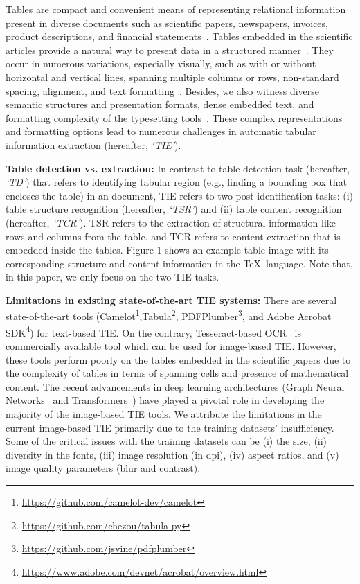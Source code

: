 \documentclass[runningheads]{llncs}
\begin{document}
Tables are compact and convenient means of representing relational information present in diverse documents such as scientific papers, newspapers, invoices, product descriptions, and financial statements~\cite{tkasar}. Tables embedded in the scientific articles provide a natural way to present data in a structured manner~\cite{douglas1995using}. They occur in numerous variations, especially visually, such as with or without horizontal and vertical lines, spanning multiple columns or rows, non-standard spacing, alignment, and text formatting~\cite{embley}. Besides, we also witness diverse semantic structures and presentation formats, dense embedded text, and formatting complexity of the typesetting tools~\cite{singh2019automated}. These complex representations and formatting options lead to numerous challenges in automatic tabular information extraction (hereafter, \textit{`TIE'}). 

\noindent \textbf{Table detection vs. extraction:}
In contrast to table detection task (hereafter, \textit{`TD'}) that refers to identifying tabular region (e.g., finding a bounding box that encloses the table) in an document, TIE refers to two post identification tasks: (i) table structure recognition (hereafter, \textit{`TSR'}) and (ii) table content recognition (hereafter, \textit{`TCR'}). TSR refers to the extraction of structural information like rows and columns from the table, and TCR refers to content extraction that is embedded inside the tables. Figure 1 shows an example table image with its corresponding structure and content information in the \TeX~language. Note that, in this paper, we only focus on the two TIE tasks. 


\noindent \textbf{Limitations in existing state-of-the-art TIE systems:} There are several state-of-the-art tools (Camelot\footnote{\url{https://github.com/camelot-dev/camelot}},Tabula\footnote{\url{https://github.com/chezou/tabula-py}}, PDFPlumber\footnote{\url{https://github.com/jsvine/pdfplumber}}, and Adobe Acrobat SDK\footnote{\url{https://www.adobe.com/devnet/acrobat/overview.html}}) for text-based TIE. On the contrary, Tesseract-based OCR~\cite{tesseract} is commercially available tool which can be used for image-based TIE. However, these tools perform poorly on the tables embedded in the scientific papers due to the complexity of tables in terms of spanning cells and presence of mathematical content.
The recent advancements in deep learning architectures (Graph Neural Networks~\cite{gnn} and Transformers~\cite{vaswani2017attention}) have played a pivotal role in developing the majority of the image-based TIE tools. 
We attribute the limitations in the current image-based TIE primarily due to the training datasets' insufficiency. Some of the critical issues with the training datasets can be (i) the size, (ii) diversity in the fonts, (iii) image resolution (in dpi), (iv) aspect ratios, and (v) image quality parameters (blur and contrast). 
\end{document}
